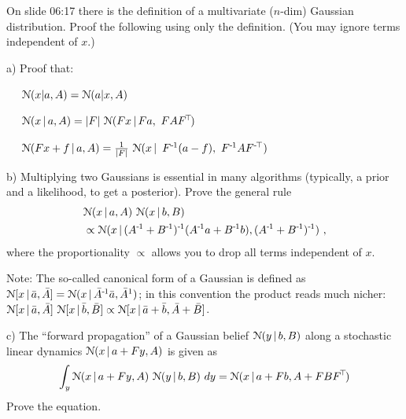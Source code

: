On slide 06:17 there is the definition of a multivariate ($n$-dim)
Gaussian distribution. Proof the following using only the
definition. (You may ignore terms independent of $x$.)

a) Proof that:

~~ $\NN(x|a,A) = \NN(a|x,A)$

~~ $\NN(x\|a,A) = |F|~ \NN(Fx \| Fa,~FAF^\T)$

~~ $\NN(F x + f \| a,A) = \frac{1}{|F|}~ \NN(x \| ~ F^\1 (a-f),~ F^\1 AF^\mT)$

b) Multiplying two Gaussians is essential in many algorithms
(typically, a prior and a likelihood, to get a posterior). Prove the
general rule
\begin{align}
&\NN(x \| a,A)~ \NN(x \| b,B) \feed
 &\propto \NN(x \| (A^\1+B^\1)^\1 (A^\1 a + B^\1 b) ,(A^\1+B^\1)^\1) ~,
\end{align}
where the proportionality $\propto$ allows you to drop all terms
independent of $x$.

{\small Note: The so-called canonical form of a Gaussian is defined as
$\NN[x \| \bar a,\bar A] = \NN(x \| \bar A^\1 \bar a, \bar A^1)$; in
this convention the product reads much nicher: $\NN[x \| \bar a,\bar
A]~ \NN[x \| \bar b,\bar B] \propto \NN[x \| \bar a+\bar b,\bar A+\bar
B]$. }

c) The ``forward propagation'' of a Gaussian belief $\NN(y \| b, B)$
along a stochastic linear dynamics $\NN(x \| a + Fy, A)$ is given as
\begin{align}
\int_y \NN(x \| a + Fy, A)~ \NN(y \| b, B)~ dy = \NN(x \| a + Fb,
A+FBF^\T)
\end{align}
Prove the equation.







\exerfoot

